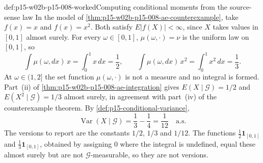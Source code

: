 \begin{hbexample}{def:p15-w02b-p15-008-worked}{Computing conditional moments from the source-sense law}
In the model of \cref{thm:p15-w02b-p15-008-ae-counterexample}, take
\(f(x)=x\) and \(f(x)=x^2\). Both satisfy \(E|f(X)|<\infty\), since \(X\)
takes values in \([0,1]\) almost surely. For every \(\omega\in[0,1]\),
\(\mu(\omega,\cdot)=\nu\) is the uniform law on \([0,1]\), so
\[
 \int\mu(\omega,dx)\,x=\int_0^1x\,dx=\frac12,\qquad
 \int\mu(\omega,dx)\,x^2=\int_0^1x^2\,dx=\frac13 .
\]
At \(\omega\in(1,2]\) the set function \(\mu(\omega,\cdot)\) is not a
measure and no integral is formed. Part~(ii) of
\cref{thm:p15-w02b-p15-008-ae-integration} gives
\(E(X\mid\mathcal G)=1/2\) and \(E(X^2\mid\mathcal G)=1/3\) almost surely,
in agreement with part~(iv) of the counterexample theorem. By
\cref{def:p15-conditional-variance},
\[
 \operatorname{Var}(X\mid\mathcal G)=\frac13-\frac14=\frac1{12}
                                      \quad\text{a.s.}
\]
The versions to report are the constants \(1/2\), \(1/3\) and \(1/12\).
The functions \(\frac12\mathbf1_{[0,1]}\) and \(\frac13\mathbf1_{[0,1]}\),
obtained by assigning \(0\) where the integral is undefined, equal these
almost surely but are not \(\mathcal G\)-measurable, so they are not
versions.
\end{hbexample}

